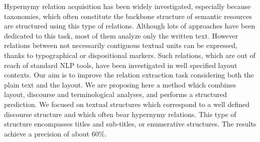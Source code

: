 Hypernymy relation acquisition has been widely investigated, especially because taxonomies, which often constitute the backbone structure of semantic resources are structured using this type of relations. Although lots of approaches have been dedicated to this task, most of them analyze only the written text. However relations between not necessarily contiguous textual units can be expressed, thanks to typographical or dispositional markers. Such relations, which are out of reach of standard NLP tools, have been investigated in well specified layout contexts. Our aim is to improve the relation extraction task considering both the plain text and the layout. We are proposing here a method which combines layout, discourse and terminological analyses, and performs a structured prediction. We focused on textual structures which correspond to a well defined discourse structure and which often bear hypernymy relations. This type of structure encompasses titles and sub-titles, or enumerative structures. The results achieve a precision of about 60\%.

